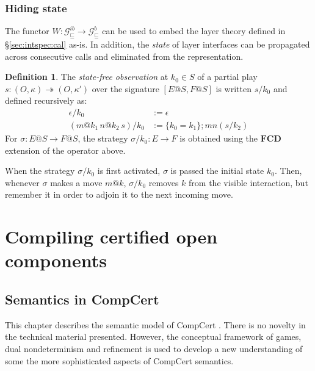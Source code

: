 \documentclass[draft,11pt]{report}
\theoremstyle{definition}
\newtheorem{definition}[theorem]{Definition}
\newcommand{\gcat}{\mathcal{G}_{\sqsubseteq}}
\begin{document}
\section{Hiding state} \label{sec:gamesem:pack} %

The functor
$W : \gcat^{ib} \rightarrow \gcat^b$
can be used to embed the layer theory
defined in \S\ref{sec:intspec:cal} as-is.
In addition, the \emph{state} of layer interfaces
can be propagated across consecutive calls and
eliminated from the representation.

\begin{definition}
The \emph{state-free observation} at $k_0 \in S$
of a partial play
$s : (O, \kappa) \twoheadrightarrow (O, \kappa')$
over the signature $[E@S, F@S]$
is written $s/k_0$ and defined recursively as:
\begin{align*}
    \epsilon / k_0 &:= \epsilon \\
    (m@k_1 \, n@k_2 \, s) / k_0 &:=
      \{ k_0 = k_1 \} ; m n (s / k_2)
\end{align*}
For $\sigma : E@S \rightarrow F@S$,
the strategy $\sigma / k_0 : E \rightarrow F$
is obtained using the $\mathbf{FCD}$ extension
of the operator above.
\end{definition}

When the strategy $\sigma / k_0$ is first activated,
$\sigma$ is passed the initial state $k_0$.
Then, whenever $\sigma$ makes a move $m@k$,
$\sigma / k_0$ removes $k$ from the visible interaction,
but remember it in order to adjoin it to the next incoming move.



\part{Compiling certified open components} \label{part:compcerto}

\chapter{Semantics in CompCert} \label{sec:compcert-sem} %

This chapter describes the semantic model of CompCert \citep{compcert}.
There is no novelty in the technical material presented.
However,
the conceptual framework of
games, dual nondeterminism and refinement is used to
develop a new understanding of
some the more sophisticated aspects of
CompCert semantics.
\end{document}
